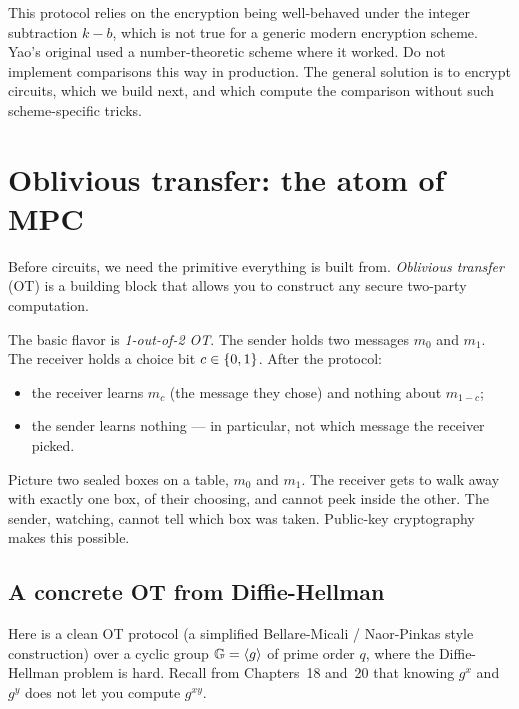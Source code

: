 \begin{trapbox}
This protocol relies on the encryption being well-behaved under the integer subtraction $k - b$, which is not true for a generic modern encryption scheme. Yao's original used a number-theoretic scheme where it worked. Do not implement comparisons this way in production. The general solution is to encrypt circuits, which we build next, and which compute the comparison without such scheme-specific tricks.
\end{trapbox}

\section{Oblivious transfer: the atom of MPC}
\label{ch34:ot}

Before circuits, we need the primitive everything is built from. \emph{Oblivious transfer} (OT) is a building block that allows you to construct any secure two-party computation.

The basic flavor is \emph{1-out-of-2 OT}. The sender holds two messages $m_0$ and $m_1$. The receiver holds a choice bit $c \in \{0,1\}$. After the protocol:

\begin{itemize}
  \item the receiver learns $m_c$ (the message they chose) and nothing about $m_{1-c}$;
  \item the sender learns nothing --- in particular, not which message the receiver picked.
\end{itemize}

\begin{intuitionbox}
Picture two sealed boxes on a table, $m_0$ and $m_1$. The receiver gets to walk away with exactly one box, of their choosing, and cannot peek inside the other. The sender, watching, cannot tell which box was taken. Public-key cryptography makes this possible.
\end{intuitionbox}

\subsection{A concrete OT from Diffie-Hellman}

Here is a clean OT protocol (a simplified Bellare-Micali / Naor-Pinkas style construction) over a cyclic group $\mathbb{G} = \langle g \rangle$ of prime order $q$, where the Diffie-Hellman problem is hard. Recall from Chapters~18 and~20 that knowing $g^x$ and $g^y$ does not let you compute $g^{xy}$.

